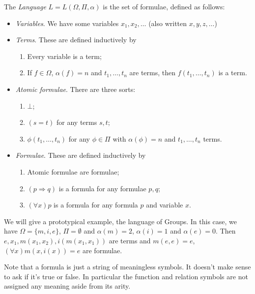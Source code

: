 \documentclass[a3paper, 10pt]{article}
\renewcommand{\vocab}[1]{\emph{#1}}
\begin{document}
\begin{multicols*}{5}
\begin{definition}[Language]
  The \vocab{Language} $L = L(\Omega, \Pi, \alpha)$ is the set of formulae, defined as follows:
  \begin{itemize}
    \item \emph{Variables}. We have some variables $x_1, x_2, \dots$ (also written $x, y, z, \dots$)
    \item \emph{Terms}. These are defined inductively by
    \begin{enumerate}
      \item Every variable is a term;
      \item If $f \in \Omega$, $\alpha(f) = n$ and $t_1, \dots, t_n$ are terms, then $f(t_1, \dots, t_n)$ is a term.
    \end{enumerate}
    \item \emph{Atomic formulae}. There are three sorts:
    \begin{enumerate}
      \item $\bot$;
      \item $(s = t)$ for any terms $s, t$;
      \item $\phi(t_1, \dots, t_n)$ for any $\phi \in \Pi$ with $\alpha(\phi) = n$ and $t_1, \dots, t_n$ terms.
    \end{enumerate}
    \item \emph{Formulae}. These are defined inductively by
    \begin{enumerate}
      \item Atomic formulae are formulae;
      \item $(p \Rightarrow q)$ is a formula for any formulae $p, q$;
      \item $(\forall x) p$ is a formula for any formula $p$ and variable $x$.
    \end{enumerate}
  \end{itemize}
\end{definition}

\begin{example}
  We will give a prototypical example, the language of Groups. In this case, we have $\Omega = \{m , i, e\}$, $\Pi = \emptyset$ and $\alpha(m) = 2$, $\alpha(i) = 1$ and $\alpha(e) = 0$. Then $e, x_1, m(x_1, x_2), i(m(x_1, x_1))$ are terms and $m(e, e) = e$, $(\forall x)m(x, i(x)) = e$ are formulae.
\end{example}

Note that a formula is just a string of meaningless symbols. It doesn't make sense to ask if it's true or false. In particular the function and relation symbols are not assigned any meaning aside from its arity. 


\end{multicols*}
\end{document}
